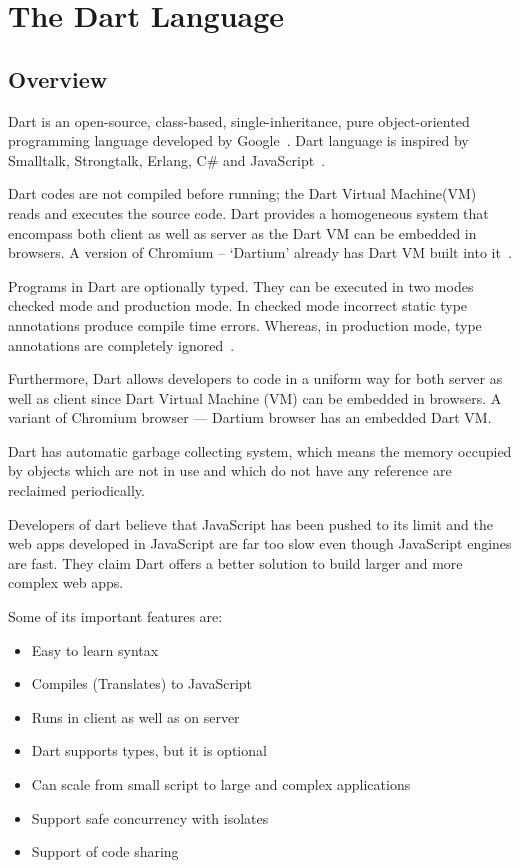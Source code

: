 \section{The Dart Language}
\label{sec:dart}
  \subsection{Overview}
  Dart is an open-source, class-based, single-inheritance, pure object-oriented programming language developed by Google~\cite{dartEcma}. Dart language is inspired by Smalltalk, Strongtalk, Erlang, C\# and JavaScript~\cite{sethladd}.

  Dart codes are not compiled before running; the Dart Virtual Machine(VM) reads and executes the source code. Dart provides a homogeneous system that encompass both client as well as server as the Dart VM can be embedded in browsers. A version of Chromium – ‘Dartium’ already has Dart VM built into it~\cite{sethladd}.

  Programs in Dart are optionally typed. They can be executed in two modes checked mode and production mode. In checked mode incorrect static type annotations produce compile time errors. Whereas, in production mode, type annotations are completely ignored~\cite{dartEcma}.

  Furthermore, Dart allows developers to code in a uniform way for both server as well as client since Dart Virtual Machine (VM) can be embedded in browsers. A variant of Chromium browser — Dartium browser has an embedded Dart VM.

  Dart has automatic garbage collecting system, which means the memory occupied by objects which are not in use and which do not have any reference are reclaimed periodically.

  Developers of dart believe that JavaScript has been pushed to its limit and the web apps developed in JavaScript are far too slow even though JavaScript engines are fast. They claim Dart offers a better solution to build larger and more complex web apps\cite{laddWalrath}.

Some of its important features are:
  \begin{itemize}
    \item Easy to learn syntax
    \item Compiles (Translates) to JavaScript
    \item Runs in client as well as on server
    \item Dart supports types, but it is optional
    \item Can scale from small script to large and complex applications
    \item Support safe concurrency with isolates
    \item Support of code sharing
  \end{itemize}


